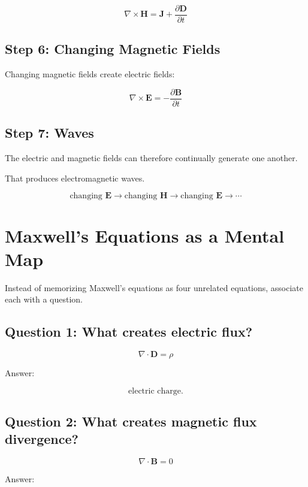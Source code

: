 \documentclass[11pt]{article}
\newcommand{\vect}[1]{\mathbf{#1}}
\begin{document}
\[
\boxed{
\nabla\times\vect{H}
=
\vect{J}
+
\frac{\partial\vect{D}}{\partial t}
}
\]

\subsection*{Step 6: Changing Magnetic Fields}

Changing magnetic fields create electric fields:

\[
\boxed{
\nabla\times\vect{E}
=
-\frac{\partial\vect{B}}{\partial t}
}
\]

\subsection*{Step 7: Waves}

The electric and magnetic fields can therefore continually generate one another.

That produces electromagnetic waves.

\[
\boxed{
\text{changing }\vect{E}
\rightarrow
\text{changing }\vect{H}
\rightarrow
\text{changing }\vect{E}
\rightarrow
\cdots
}
\]



\section{Maxwell's Equations as a Mental Map}

Instead of memorizing Maxwell's equations as four unrelated equations, associate each with a question.

\subsection*{Question 1: What creates electric flux?}

\[
\boxed{
\nabla\cdot\vect{D}
=
\rho
}
\]

Answer:

\[
\text{electric charge}.
\]

\subsection*{Question 2: What creates magnetic flux divergence?}

\[
\boxed{
\nabla\cdot\vect{B}
=
0
}
\]

Answer:
\end{document}
